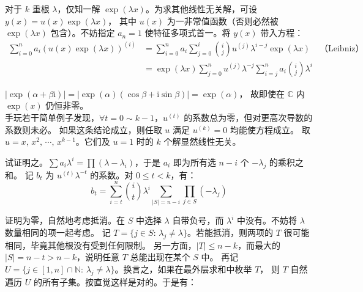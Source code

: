 \documentclass[12pt, a4paper, UTF8, openany]{ctexbook}
\newcommand{\field}[1]{\mathbb{#1}}%
\newcommand{\imunit}{\mathrm{i}}%
\begin{document}
        对于 $k$ 重根 $\lambda$，仅知一解 $\exp(\lambda x)$。为求其他线性无关解，可设 $y(x) = u(x)\exp(\lambda x)$，
        其中 $u(x)$ 为一非常值函数（否则必然被 $\exp(\lambda x)$ 包含）。不妨指定 $a_n = 1$ 使特征多项式首一。将 $y(x)$ 带入方程：
        $$\begin{aligned}
            \sum_{i = 0}^{n} a_i (u(x)\exp(\lambda x))^{(i)}
            & = \sum_{i = 0}^{n} a_i \sum_{j = 0}^{i} \binom{i}{j} u^{(j)} \lambda^{i - j} \exp(\lambda x) & \text{（Leibniz）} \\
            & = \exp(\lambda x) \sum_{j = 0}^{n} u^{(j)} \lambda^{-j} \sum_{i = j}^{n} a_i \binom{i}{j} \lambda^{i}
        \end{aligned}$$

        $|\exp(\alpha + \beta\imunit)| = |\exp(\alpha)(\cos\beta + \imunit\sin\beta)| = \exp(\alpha)$，
        故即使在 $\field{C}$ 内 $\exp(x)$ 仍恒非零。\\
        手玩若干简单例子发现，$\forall t = 0 \sim k - 1$，$u^{(t)}$ 的系数总为零，但对更高次导数的系数则未必。
        如果这条结论成立，则任取 $u$ 满足 $u^{(k)} = 0$ 均能使方程成立。
        取 $u = x, \, x^2, \, \cdots, \, x^{k - 1}$。它们及 $u = 1$ 时的 $k$ 个解显然线性无关。

        试证明之。$\sum a_i \lambda^i = \prod (\lambda - \lambda_i)$，于是 $a_i$ 即为所有选 $n - i$ 个 $-\lambda_j$ 的乘积之和。
        记 $b_t$ 为 $u^{(t)}\lambda^{-t}$ 的系数。对 $0 \leqslant t < k$，有：
        $$b_t = \sum_{i = t}^{n} \binom{i}{t} \lambda^{i} \sum_{|S| = n - i} \prod_{j \in S} (-\lambda_j)$$

        证明为零，自然地考虑抵消。在 $S$ 中选择 $\lambda$ 自带负号，而 $\lambda^i$ 中没有。不妨将 $\lambda$ 数量相同的项一起考虑。
        记 $T = \{j \in S: \, \lambda_j \neq \lambda\}$。若能抵消，则两项的 $T$ 很可能相同，毕竟其他根没有受到任何限制。
        另一方面，$|T| \leqslant n - k$，而最大的 $|S| = n - t > n - k$，说明任意 $T$ 总能出现在某个 $S$ 中。
        再记 $U = \{j \in [1, n] \cap \field{N}: \, \lambda_j \neq \lambda\}$。换言之，如果在最外层求和中枚举 $T$，
        则 $T$ 自然遍历 $U$ 的所有子集。按直觉这样是对的。于是有：
\end{document}
